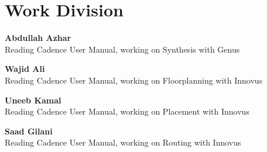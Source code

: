 
\chapter{Work Division}
\label{Chapter9}

\textbf{Abdullah Azhar}\\
Reading Cadence User Manual, working on Synthesis with Genus

\textbf{Wajid Ali}\\
Reading Cadence User Manual, working on Floorplanning with Innovus

\textbf{Uneeb Kamal}\\
Reading Cadence User Manual, working on Placement with Innovus

\textbf{Saad Gilani}\\
Reading Cadence User Manual, working on Routing with Innovus